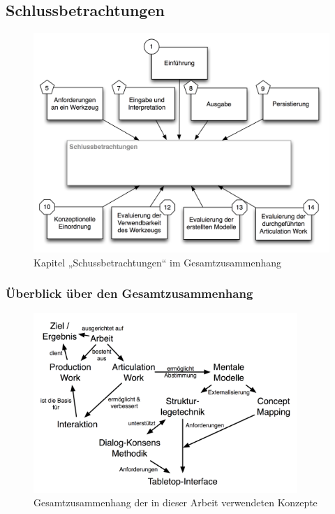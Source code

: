 \part*{}

\chapter{Schlussbetrachtungen} %
\label{cha:schlussbetrachtungen}

\begin{figure}[htbp]
	\centering
		\includegraphics[scale=0.6]{img/Kontextgrafiken/k15.png}
	\caption{Kapitel „Schussbetrachtungen“ im Gesamtzusammenhang}
	\label{fig:img_Kontextgrafiken_k15}
\end{figure}

\section{Überblick über den Gesamtzusammenhang} %
\label{sec:überblick_über_den_gesamtzusammenhang}

\begin{figure}[htbp]
	\centering
		\includegraphics[width=10cm]{img/Schlussbetrachtungen/ArbeitInteraktionMentaleModelleTabletop.png}
	\caption{Gesamtzusammenhang der in dieser Arbeit verwendeten Konzepte}
	\label{fig:img_Schlussbetrachtungen_ArbeitInteraktionMentaleModelleTabletop}
\end{figure}


